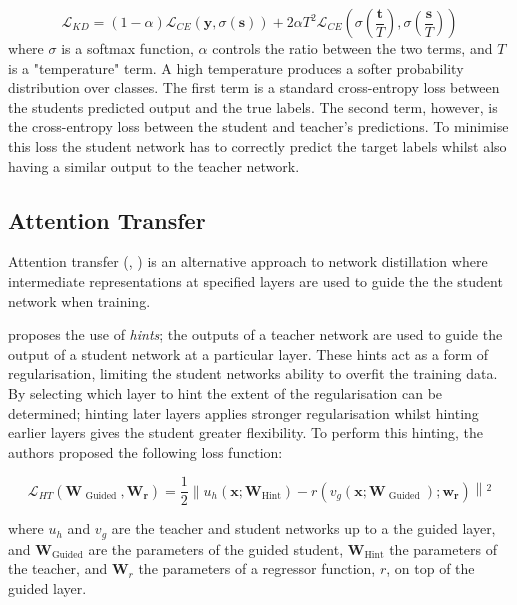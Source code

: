 \documentclass[a4paper,11pt]{article}
\begin{document}
\begin{equation}
    \mathcal{L}_{K D}=(1-\alpha) \mathcal{L}_{C E}(\mathbf{y}, \sigma(\mathbf{s}))+2 \alpha T^{2} \mathcal{L}_{C E}\left(\sigma\left(\frac{\mathbf{t}}{T}\right), \sigma\left(\frac{\mathbf{s}}{T}\right)\right)
\end{equation}
where $\sigma$ is a softmax function, $\alpha$ controls the ratio between the two terms, and $T$ is a "temperature" term. A high temperature produces a softer probability distribution over classes. The first term is a standard cross-entropy loss between the students predicted output and the true labels. The second term, however, is the cross-entropy loss between the student and teacher's predictions. To minimise this loss the student network has to correctly predict the target labels whilst also having a similar output to the teacher network.

\subsection{Attention Transfer}
Attention transfer (\cite{romero2014fitnets}, \cite{zagoruyko2016paying}) is an alternative approach to network distillation where intermediate representations at specified layers are used to guide the the student network when training. 

\cite{romero2014fitnets} proposes the use of \textit{hints}; the outputs of a teacher network are used to guide the output of a student network at a particular layer. These hints act as a form of regularisation, limiting the student networks ability to overfit the training data. By selecting which layer to hint the extent of the regularisation can be determined; hinting later layers applies stronger regularisation whilst hinting earlier layers gives the student greater flexibility. To perform this hinting, the authors proposed the following loss function:

\begin{equation}
    \mathcal{L}_{H T}\left(\mathbf{W}_{\text { Guided }}, \mathbf{W}_{\mathbf{r}}\right)=\frac{1}{2} \| u_{h}\left(\mathbf{x} ; \mathbf{W}_{\text{Hint}}\right)-r\left(v_{g}\left(\mathbf{x} ; \mathbf{W}_{\text { Guided }}\right) ; \mathbf{w}_{\mathbf{r}}\right)\left\|^{2}\right.
\end{equation}

where $u_h$ and $v_g$ are the teacher and student networks up to a the guided layer, and $\mathbf{W}_{\text{Guided}}$ are the parameters of the guided student, $\mathbf{W}_{\text{Hint}}$ the parameters of the teacher, and $\mathbf{W}_r$ the parameters of a regressor function, $r$, on top of the guided layer.
\end{document}
